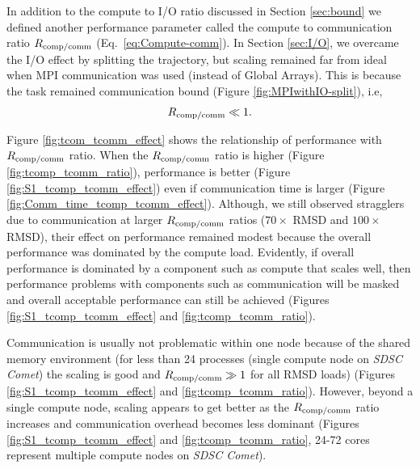 \label{sec:tcomm}

In addition to the compute to I/O ratio \RcompIO discussed in Section \ref{sec:bound} we defined another performance parameter called the compute to communication ratio $R_{\text{comp/comm}}$ (Eq.~\ref{eq:Compute-comm}).
In Section \ref{sec:I/O}, we overcame the I/O effect by splitting the trajectory, but scaling remained far from ideal when MPI communication was used (instead of  Global Arrays).
This is because the task remained communication bound (Figure \ref{fig:MPIwithIO-split}), i.e, 
\begin{gather*}
  R_{\text{comp/comm}} \ll 1.
\end{gather*}

Figure \ref{fig:tcom_tcomm_effect} shows the relationship of performance with $R_{\text{comp/comm}}$ ratio.
When the $R_{\text{comp/comm}}$ ratio is higher (Figure \ref{fig:tcomp_tcomm_ratio}), performance is better (Figure \ref{fig:S1_tcomp_tcomm_effect}) even if communication time is larger (Figure \ref{fig:Comm_time_tcomp_tcomm_effect}).
Although, we still observed stragglers due to communication at larger $R_{\text{comp/comm}}$ ratios ($70\times$ RMSD and $100\times$ RMSD), their effect on performance remained modest because the overall performance was dominated by the compute load. 
Evidently, if overall performance is dominated by a component such as compute that scales well, then performance problems with components such as communication will be masked and overall acceptable performance can still be achieved (Figures \ref{fig:S1_tcomp_tcomm_effect} and \ref{fig:tcomp_tcomm_ratio}).

Communication is usually not problematic within one node because of the shared memory environment (for less than 24 processes (single compute node on \emph{SDSC Comet}) the scaling is good and $R_{\text{comp/comm}} \gg 1$ for all RMSD loads) (Figures \ref{fig:S1_tcomp_tcomm_effect} and \ref{fig:tcomp_tcomm_ratio}).
However, beyond a single compute node, scaling appears to get better as the $R_{\text{comp/comm}}$ ratio increases and communication overhead becomes less dominant (Figures \ref{fig:S1_tcomp_tcomm_effect} and \ref{fig:tcomp_tcomm_ratio}, 24-72 cores represent multiple compute nodes on \emph{SDSC Comet}).

